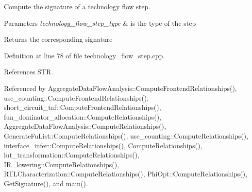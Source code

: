 Compute the signature of a technology flow step. 


\begin{DoxyParams}{Parameters}
{\em technology\+\_\+flow\+\_\+step\+\_\+type} & is the type of the step \\
\hline
\end{DoxyParams}
\begin{DoxyReturn}{Returns}
the corresponding signature 
\end{DoxyReturn}


Definition at line 78 of file technology\+\_\+flow\+\_\+step.\+cpp.



References S\+TR.



Referenced by Aggregate\+Data\+Flow\+Analysis\+::\+Compute\+Frontend\+Relationships(), use\+\_\+counting\+::\+Compute\+Frontend\+Relationships(), short\+\_\+circuit\+\_\+taf\+::\+Compute\+Frontend\+Relationships(), fun\+\_\+dominator\+\_\+allocation\+::\+Compute\+Relationships(), Aggregate\+Data\+Flow\+Analysis\+::\+Compute\+Relationships(), Generate\+Fu\+List\+::\+Compute\+Relationships(), use\+\_\+counting\+::\+Compute\+Relationships(), interface\+\_\+infer\+::\+Compute\+Relationships(), Compute\+Relationships(), lut\+\_\+transformation\+::\+Compute\+Relationships(), I\+R\+\_\+lowering\+::\+Compute\+Relationships(), R\+T\+L\+Characterization\+::\+Compute\+Relationships(), Phi\+Opt\+::\+Compute\+Relationships(), Get\+Signature(), and main().

